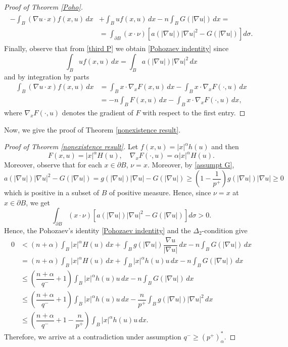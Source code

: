 \documentclass[leqno,twoside, 12pt]{amsart}
\theoremstyle{plain}
\numberwithin{equation}{section} \numberwithin{figure}{section}
\theoremstyle{definition}
\numberwithin{equation}{section}
\begin{document}
\begin{proof}[Proof of Theorem \ref{Poho}]
\begin{align}\label{third P}
\begin{split}
-\int_B (\nabla u \cdot x)f(x, u) \,dx &+ \int_B u f(x, u)\,dx  - n\int_B G(|\nabla u|)\,dx=\\
&=\int_{\partial B}(x\cdot \nu) \left[a(|\nabla u|)|\nabla u|^2- G(|\nabla u|)\right] d\sigma.
\end{split}
\end{align}
Finally, observe that from \eqref{third P} we obtain \eqref{Pohozaev indentity} since
$$\int_B u f(x, u)\,dx = \int_B a(|\nabla u|)|\nabla u|^2\,dx$$and by integration by parts
\begin{align*}
\int_B (\nabla u \cdot x)f(x, u) \,dx&=\int_B x\cdot \nabla_x F(x, u)\,dx - \int_B x\cdot \nabla_x F(\cdot, u)\,dx\\ 
&= -n\int_B F(x, u)\,dx - \int_B x\cdot \nabla_x F(\cdot, u)\,dx,
\end{align*}
where
$\nabla_x F(\cdot, u)$ denotes the gradient of $F$ with respect to the first entry.
\end{proof}

Now, we give the proof of Theorem \ref{nonexistence result}. 

\begin{proof}[Proof of Theorem \ref{nonexistence result}] Let $f(x, u)=|x|^\alpha h(u)$ and then 
$$F(x, u)= |x|^\alpha H(u), \quad \nabla_xF(\cdot, u)= \alpha |x|^\alpha H(u).$$Moreover, observe that for each $x\in \partial B$, $\nu=x$. Moreover, by \eqref{assumpt G},
$$a(|\nabla u|)|\nabla u|^2-G(|\nabla u|)= g(|\nabla u|)|\nabla u|-G(|\nabla u|) \geq \left(1-\dfrac{1}{p^{+}} \right) g(|\nabla u|)|\nabla u|\geq 0$$which is positive in a subset of $B$ of positive measure. Hence, since $\nu = x$ at $x\in \partial B$, we get
$$\int_{\partial B}(x\cdot \nu) \left[a(|\nabla u|)|\nabla u|^2- G(|\nabla u|)\right] d\sigma >0 .
$$
Hence, the Pohozaev's identity \eqref{Pohozaev indentity} and the $\Delta_2$-condition give
\begin{equation}
\begin{split}
0 & < (n+\alpha)\int_B |x|^\alpha H(u)\,dx + \int_B g(|\nabla u|)\dfrac{\nabla u}{|\nabla u|}\,dx -n\int_B G(|\nabla u|)\,dx \\ & = (n+\alpha)\int_B |x|^\alpha H(u)\,dx+ \int_B |x|^\alpha h(u)u\,dx-n\int_B G(|\nabla u|)\,dx\\ & \leq \left(\dfrac{n+\alpha}{q^{-}}+1\right)\int_B |x|^\alpha h(u)u\,dx-n\int_B G(|\nabla u|)\,dx \\ & \leq \left(\dfrac{n+\alpha}{q^{-}}+1\right)\int_B |x|^\alpha h(u)u\,dx-\dfrac{n}{p^{+}} \int_B g(|\nabla u|)|\nabla u|^2\,dx \\ & \leq \left(\dfrac{n+\alpha}{q^{-}}+1 -\dfrac{n}{p^{+}}\right)\int_B |x|^\alpha h(u)u\,dx.
\end{split}
\end{equation}Therefore, we arrive at a contradiction under assumption $q^-\geq (p^+)_\alpha^*$. 
\end{proof}
\appendix
\end{document}

